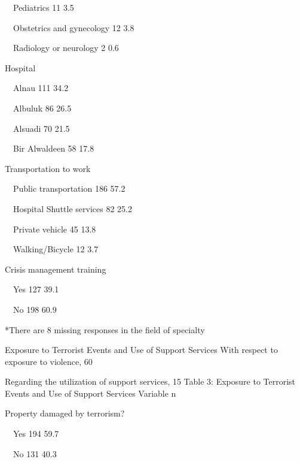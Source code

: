 Pediatrics
11
3.5%

 Obstetrics and gynecology
12
3.8%

 Radiology or neurology
2
0.6%

Hospital



 Alnau                             
111  
34.2%

 Albuluk                           
86   
26.5%

 Alsuadi                           
70   
21.5%

 Bir Alwaldeen                     
58   
17.8%

Transportation to work 



 Public transportation                                    
186   
57.2%

 Hospital Shuttle services                                
82    
25.2%

 Private vehicle                                          
45    
13.8%

 Walking/Bicycle                                          
12    
3.7%

Crisis management training



 Yes
127   
39.1%

 No
198   
60.9%

*There are 8 missing responses in the field of specialty

Exposure to Terrorist Events and Use of Support Services
With respect to exposure to violence, 60%


Regarding the utilization of support services, 15%
Table 3: Exposure to Terrorist Events and Use of Support Services
Variable
n
%

Property damaged by terrorism?



 Yes                                                                    
194
59.7%

 No                                                                     
131
40.3%

